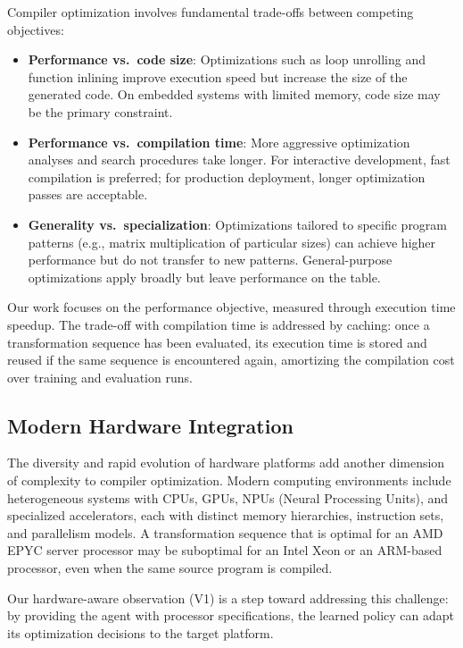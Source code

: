 Compiler optimization involves fundamental trade-offs between competing objectives:

\begin{itemize}
    \item \textbf{Performance vs.\ code size}: Optimizations such as loop unrolling and function inlining improve execution speed but increase the size of the generated code. On embedded systems with limited memory, code size may be the primary constraint.
    \item \textbf{Performance vs.\ compilation time}: More aggressive optimization analyses and search procedures take longer. For interactive development, fast compilation is preferred; for production deployment, longer optimization passes are acceptable.
    \item \textbf{Generality vs.\ specialization}: Optimizations tailored to specific program patterns (e.g., matrix multiplication of particular sizes) can achieve higher performance but do not transfer to new patterns. General-purpose optimizations apply broadly but leave performance on the table.
\end{itemize}

Our work focuses on the performance objective, measured through execution time speedup. The trade-off with compilation time is addressed by caching: once a transformation sequence has been evaluated, its execution time is stored and reused if the same sequence is encountered again, amortizing the compilation cost over training and evaluation runs.

\subsection{Modern Hardware Integration}

The diversity and rapid evolution of hardware platforms add another dimension of complexity to compiler optimization. Modern computing environments include heterogeneous systems with CPUs, GPUs, NPUs (Neural Processing Units), and specialized accelerators, each with distinct memory hierarchies, instruction sets, and parallelism models. A transformation sequence that is optimal for an AMD EPYC server processor may be suboptimal for an Intel Xeon or an ARM-based processor, even when the same source program is compiled.

Our hardware-aware observation (V1) is a step toward addressing this challenge: by providing the agent with processor specifications, the learned policy can adapt its optimization decisions to the target platform.

